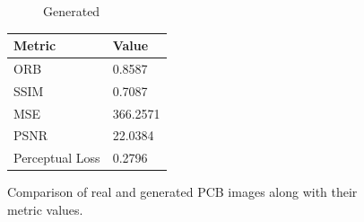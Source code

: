 \documentclass[12pt,DIV14,BCOR12mm,a4paper,footinclude=false,headinclude,parskip=half-,twoside,openright,cleardoublepage=empty,toc=index,bibliography=totoc,listof=totoc]{scrreprt}
\numberwithin{equation}{chapter}
\begin{document}
\begin{figure}
\begin{minipage}[H]{0.5\linewidth}
\begin{subfigure}[t]{0.48\linewidth}
            \caption{Generated}
        \end{subfigure}
    \end{minipage}%
    \hfill
    \begin{minipage}[H]{0.5\linewidth} %
        \centering
        \small
        \begin{tabular}{p{3cm} p{2cm}}
            \toprule
            \textbf{Metric} & \textbf{Value} \\
            \midrule
            ORB             & 0.8587        \\
            SSIM            & 0.7087        \\
            MSE             & 366.2571      \\
            PSNR            & 22.0384       \\
            Perceptual Loss & 0.2796        \\
            \bottomrule
        \end{tabular}
    \end{minipage}%
    \caption{Comparison of real and generated PCB images along with their metric values.}
    \label{fig:comparison_real_generated_1_1_pcb}
\end{figure}
\end{document}
